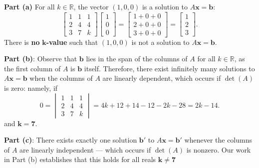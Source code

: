 \documentclass[11pt]{article}
\renewcommand{\vec}[1]{\mathbf{#1}}
\begin{document}
\textbf{Part (a)} For all $k \in \mathbb{R}$, the vector $(1, 0, 0)$ is a solution to $A \vec{x} = \vec{b}$: 
\[
	\begin{bmatrix} 1 & 1 & 1 \\ 2 & 4 & 4 \\ 3 & 7 & k \end{bmatrix} \begin{bmatrix} 1 \\ 0 \\ 0 \end{bmatrix} = \begin{bmatrix} 1 + 0 + 0 \\ 2 + 0 + 0 \\ 3 + 0 + 0 \end{bmatrix} = \begin{bmatrix} 1 \\ 2 \\ 3 \end{bmatrix}.
\]
There is \textbf{no} $\mathbf{k}$\textbf{-value} such that $(1, 0, 0)$ is not a solution to $A \vec{x} = \vec{b}$.

\textbf{Part (b)}: Observe that $\vec{b}$ lies in the span of the columns of $A$ for all $k \in \mathbb{R}$, as the first column of $A$ is $\vec{b}$ itself. Therefore, there exist infinitely many solutions to $A \vec{x} = \vec{b}$ when the columns of $A$ are linearly dependent, which occurs if $\det(A)$ is zero: namely, if  
\[
	0 = \begin{vmatrix} 1 & 1 & 1 \\ 2 & 4 & 4 \\ 3 & 7 & k \end{vmatrix} = 4k + 12 + 14 - 12 - 2k - 28 = 2k - 14.
\]
and $\mathbf{k = 7}$.

\textbf{Part (c)}: There exists exactly one solution $\vec{b}'$ to $A \vec{x} = \vec{b}'$ whenever the columns of $A$ are linearly independent --- which occurs if $\det(A)$ is nonzero. Our work in Part (b) establishes that this holds for all reals $\mathbf{k \ne 7}$
\end{document}
